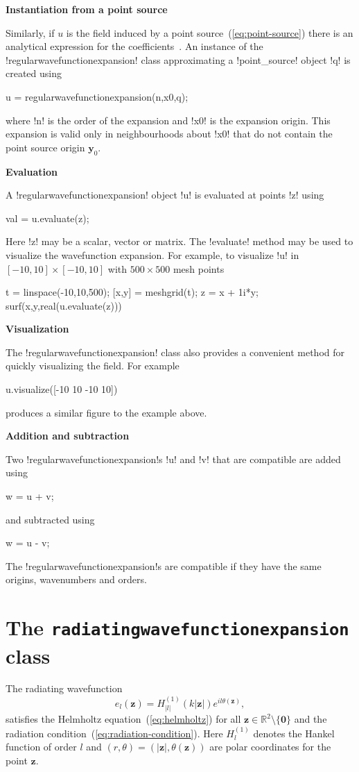 \documentclass[12pt,letterpaper,final]{article}
\newcommand{\y}{\boldsymbol{y}}
\newcommand{\z}{\boldsymbol{z}}
\newcommand{\zero}{\boldsymbol{0}}
\newcommand{\bbR}{\mathbb{R}}
\newcommand{\techheading}[1]{%
    \par\vspace{-0.3\parskip}\noindent\hspace{-1cm}\textbf{#1}%
    \par\vspace{-0.5\parskip}\noindent\nopagebreak\ignorespaces}
\begin{document}
\techheading{Instantiation from a point source}
Similarly, if $u$ is the field induced by a point source~(\ref{eq:point-source})
there is an analytical expression for the coefficients~\cite{ghh:tmatrix}.
An instance of the !regularwavefunctionexpansion! class approximating
a !point_source! object !q! is created using
\begin{matlab}
u = regularwavefunctionexpansion(n,x0,q);
\end{matlab}
where !n! is the order of the expansion and !x0! is the expansion origin.
This expansion is valid only in neighbourhoods about !x0! 
that do not contain the point
source origin $\y_0$.

\techheading{Evaluation}
A !regularwavefunctionexpansion! object !u! is evaluated at points !z! using
\begin{matlab}
val = u.evaluate(z);
\end{matlab}
Here !z! may be a scalar, vector or matrix.
The !evaluate! method may be used to visualize the wavefunction expansion.
For example, to visualize !u! in 
$[-10, 10] \times [-10, 10]$ with $500 \times 500$ mesh points 
\begin{matlab}
t = linspace(-10,10,500);
[x,y] = meshgrid(t);
z = x + 1i*y;
surf(x,y,real(u.evaluate(z)))
\end{matlab}

\techheading{Visualization}
The !regularwavefunctionexpansion! class also provides a
convenient method for quickly visualizing the field. 
For example
\begin{matlab}
u.visualize([-10 10 -10 10])
\end{matlab}
produces a similar figure to the example above.

\techheading{Addition and subtraction}
Two !regularwavefunctionexpansion!s !u! and !v! 
that are compatible
are added using
\begin{matlab}
w = u + v;
\end{matlab}
and subtracted using
\begin{matlab}
w = u - v;
\end{matlab}
The !regularwavefunctionexpansion!s are compatible if they have the same
origins, wavenumbers and orders.

\section{The \texttt{radiatingwavefunctionexpansion} class}

The radiating wavefunction
\begin{equation}
\label{eq:radiating-wavefunction}
e_{l}(\z) = H^{(1)}_{|l|}(k |\z|) e^{i l \theta(\z)},
\end{equation}
satisfies the Helmholtz equation~(\ref{eq:helmholtz}) for all
$\z \in \bbR^2 \setminus \{ \zero \}$ and the radiation condition~(\ref{eq:radiation-condition}).
Here $H^{(1)}_l$ denotes the Hankel function of order $l$ and
$(r,\theta) = (|\z|,\theta(\z))$ are polar coordinates for the point $\z$.
\end{document}
